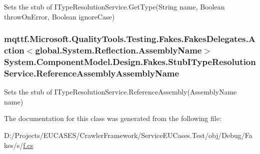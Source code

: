 Sets the stub of I\-Type\-Resolution\-Service.\-Get\-Type(\-String name, Boolean throw\-On\-Error, Boolean ignore\-Case)

\hypertarget{class_system_1_1_component_model_1_1_design_1_1_fakes_1_1_stub_i_type_resolution_service_a9faa493d9c96bb8516f30e240c1c2398}{
\subsubsection[{Reference\-Assembly\-Assembly\-Name}]{\setlength{\rightskip}{0pt plus 5cm}mqttf.\-Microsoft.\-Quality\-Tools.\-Testing.\-Fakes.\-Fakes\-Delegates.\-Action$<$global.\-System.\-Reflection.\-Assembly\-Name$>$ System.\-Component\-Model.\-Design.\-Fakes.\-Stub\-I\-Type\-Resolution\-Service.\-Reference\-Assembly\-Assembly\-Name}}\label{class_system_1_1_component_model_1_1_design_1_1_fakes_1_1_stub_i_type_resolution_service_a9faa493d9c96bb8516f30e240c1c2398}


Sets the stub of I\-Type\-Resolution\-Service.\-Reference\-Assembly(\-Assembly\-Name name)



The documentation for this class was generated from the following file\-:\begin{DoxyCompactItemize}
\item 
D\-:/\-Projects/\-E\-U\-C\-A\-S\-E\-S/\-Crawler\-Framework/\-Service\-E\-U\-Cases.\-Test/obj/\-Debug/\-Fakes/s/\hyperlink{s_2f_8cs}{f.\-cs}\end{DoxyCompactItemize}
